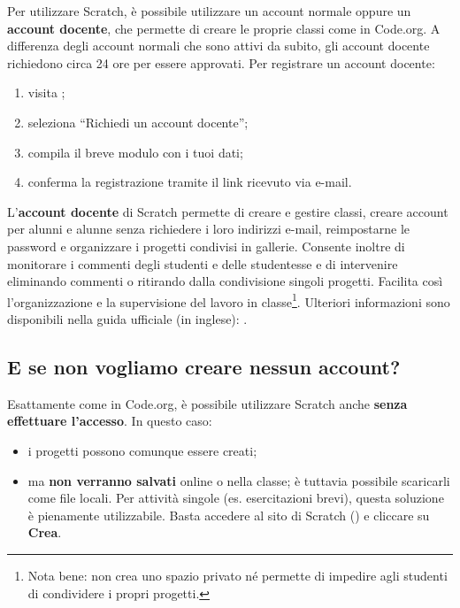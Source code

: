 Per utilizzare Scratch, è possibile utilizzare un account normale oppure un \textbf{account docente}, che permette di creare le proprie classi come in Code.org. A differenza degli account normali che sono attivi da subito, gli account docente richiedono circa 24 ore per essere approvati. Per registrare un account docente:

\begin{enumerate}
\def\labelenumi{\arabic{enumi}.}
\item
  visita ;
\item
  seleziona ``Richiedi un account docente'';
\item
  compila il breve modulo con i tuoi dati;
\item
  conferma la registrazione tramite il link ricevuto via e-mail.
\end{enumerate}

L'\textbf{account docente} di Scratch permette di creare e gestire classi, creare account per alunni e alunne senza richiedere i loro indirizzi e-mail, reimpostarne le password e organizzare i progetti condivisi in gallerie. Consente inoltre di monitorare i commenti degli studenti e delle studentesse e di intervenire eliminando commenti o ritirando dalla condivisione singoli progetti. Facilita così l'organizzazione e la supervisione del lavoro in classe\footnote{Nota bene: non crea uno spazio privato né permette di impedire agli studenti di condividere i propri progetti.}. Ulteriori informazioni sono disponibili nella guida ufficiale (in inglese): .


\subsection{E se non vogliamo creare nessun account?}


Esattamente come in Code.org, è possibile utilizzare Scratch anche \textbf{senza effettuare l'accesso}. In questo caso:

\begin{itemize}
\item
  i progetti possono comunque essere creati;
\item
  ma \textbf{non verranno salvati} online o nella classe; è tuttavia possibile scaricarli come file locali. Per attività singole (es. esercitazioni brevi), questa soluzione è pienamente utilizzabile. Basta accedere al sito di Scratch () e cliccare su \textbf{Crea}.
\end{itemize}

